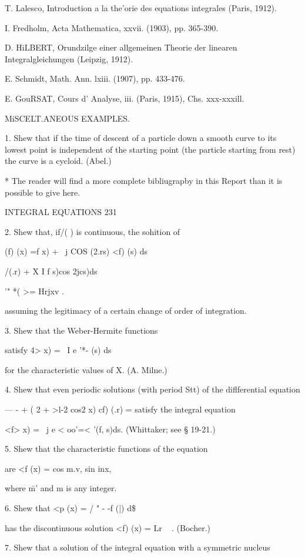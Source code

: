 {T. Lalesco, Introduction a la the'orie des equations integrales
(Paris, 1912).

I. Fredholm, Acta Mathematica, xxvii. (1903), pp. 365-390.

D. HiLBERT, Orundzilge einer allgemeinen Theorie der linearen
Integralgleichungen (Leipzig, 1912).

E. Schmidt, Math. Ann. lxiii. (1907), pp. 433-476.

E. GouRSAT, Cours d' Analyse, iii. (Paris, 1915), Chs. xxx-xxxill.

MiSCELT.ANEOUS EXAMPLES.

1. Shew that if the time of descent of a particle down a smooth curve
to its lowest point is independent of the starting point (the particle
starting from rest) the curve is a cycloid. (Abel.)

* The reader will find a more complete bibliugrapby in this Report
than it is possible to give here.



INTEGRAL EQUATIONS 231

2. Shew that, if/( ) is continuous, the sohition of

(f) (x) =f x) + \ j COS (2.rs) <f) (s) ds

/(.r) + X I f s)cos 2jcs)ds

'" *( >= Hrjxv .

assuming the legitimacy of a certain change of order of integration.

3. Shew that the Weber-Hermite functions

satisfy 4> x) = \ I e '*- (s) ds

for the characteristic values of X. (A. Milne.)

4. Shew that even periodic solutions (with period Stt) of the
diflferential equation

— - + ( 2 + >l-2 cos2 x) cf) (.r) = satisfy the integral equation

<f> x) = \ j e < oo'=< '(f, s)ds. (Whittaker; see § 19-21.)

5. Shew that the characteristic functions of the equation

are <f (x) = cos m.v, sin inx,

where \=m' and m is any integer.

6. Shew that <p (x) = / " - -f (|) d\$

has the discontinuous solution <f) (x) = Lr ~ . (Bocher.)

7. Shew that a solution of the integral equation with a symmetric
nucleus

}

